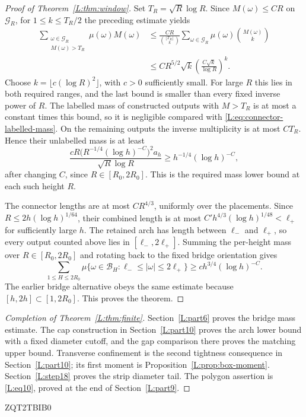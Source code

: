 \documentclass[11pt]{article}
\numberwithin{equation}{section}
\theoremstyle{definition}\newtheorem{definition}[theorem]{Definition}
\theoremstyle{remark}\newtheorem{remark}[theorem]{Remark}
\begin{document}
\begin{proof}[Proof of Theorem~\ref{L:thm:window}]
Set $T_R=\sqrt R\log R$. Since $M(\omega)\le CR$ on
$\mathcal G_R$, for $1\le k\le T_R/2$ the preceding estimate yields
\[
 \begin{aligned}
 \sum_{\substack{\omega\in\mathcal G_R\\M(\omega)>T_R}}
       \mu(\omega)M(\omega)
 &\le \frac{CR}{\binom{\lfloor T_R\rfloor}{k}}
       \sum_{\omega\in\mathcal G_R}\mu(\omega)
       \binom{M(\omega)}{k}\\
 &\le CR^{5/2}\sqrt k
       \left(\frac{C\sqrt k}{\log R}\right)^k.
 \end{aligned}
\]
Choose $k=\lfloor c(\log R)^2\rfloor$, with $c>0$ sufficiently
small. For large $R$ this lies in both required ranges, and the last
bound is smaller than every fixed inverse power of $R$. The labelled
mass of constructed outputs with $M>T_R$ is at most a constant times
this bound, so it is negligible compared with
\eqref{L:eq:connector-labelled-mass}. On the remaining outputs the
inverse multiplicity is at most $CT_R$. Hence their unlabelled mass
is at least
\[
 \frac{cR\bigl(R^{-1/4}(\log h)^{-C}\bigr)^2a_h}
      {\sqrt R\log R}
 \ge h^{-1/4}(\log h)^{-C},
\]
after changing $C$, since $R\in[R_0,2R_0]$. This is the required
mass lower bound at each such height $R$.

The connector lengths are at most $CR^{4/3}$, uniformly over the
placements.  Since $R\le2h(\log h)^{1/64}$, their combined length is
at most $C'h^{4/3}(\log h)^{1/48}<\ell_+$ for sufficiently large $h$.
The retained arch has length between $\ell_-$ and $\ell_+$, so every
output counted above lies in $[\ell_-,2\ell_+]$.  Summing the per-height
mass over $R\in[R_0,2R_0]$ and rotating back to the fixed bridge
orientation gives
\begin{equation}
 \sum_{1\le H\le2R_0}
 \mu\{\omega\in\mathcal B_H:\ell_-\le|\omega|\le2\ell_+\}
 \ge c h^{3/4}(\log h)^{-C}.
 \label{L:eq11}
\end{equation}
The earlier bridge alternative obeys the same estimate because
$[h,2h]\subset[1,2R_0]$.  This proves the theorem.
\end{proof}

\begin{proof}[Completion of Theorem~\ref{L:thm:finite}]
Section~\ref{L:part6} proves the bridge mass estimate. The cap construction
in Section~\ref{L:part10} proves the arch lower bound with a fixed diameter
cutoff, and the gap comparison there proves the matching upper bound. Transverse confinement is the second tightness
consequence in Section~\ref{L:part10}; its first moment is
Proposition~\ref{L:prop:box-moment}. Section~\ref{L:step18} proves the
strip diameter tail. The polygon assertion is \eqref{L:eq10}, proved at
the end of Section~\ref{L:part9}.
\end{proof}



ZQT2TBIB0
\end{document}
